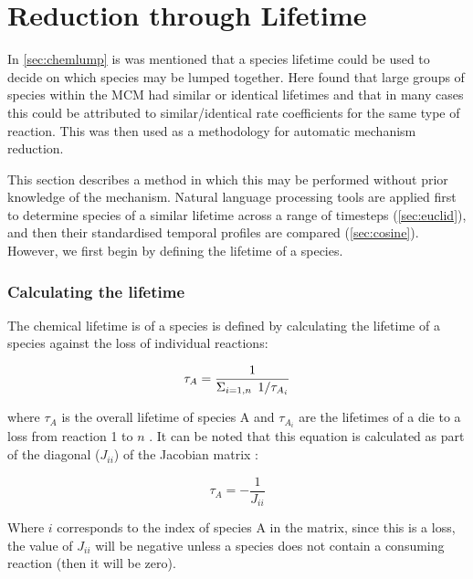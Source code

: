   \section{Reduction through Lifetime}\label{sec:lifetime}
  In \autoref{sec:chemlump} is was mentioned that a species lifetime could be used to decide on which species may be lumped together. Here \cite{lifetime} found that large groups of species within the MCM had similar or identical lifetimes and that in many cases this could be attributed to similar/identical rate coefficients for the same type of reaction. This was then used as a methodology for automatic mechanism reduction.

  This section describes a method in which this may be performed without prior knowledge of the mechanism. Natural language processing tools are applied first to determine species of a similar lifetime across a range of timesteps (\autoref{sec:euclid}), and then their standardised temporal profiles are compared (\autoref{sec:cosine}). However, we first begin by defining the lifetime of a species.

  \subsubsection{Calculating the lifetime}
  The chemical lifetime is of a species is defined by calculating the lifetime of a species against the loss of individual reactions:





    \begin{equation}
    \tau_A = \frac{1}{\Large{\Sigma}_{i=1,n}\  {1}/{\tau_{A_i}}}
    \end{equation}

where $\tau_A$ is the overall lifetime of species A and $\tau_{A_i}$ are the lifetimes of a die to a loss from reaction 1 to $n$ \citep{fundamentals}. It can be noted that this equation is calculated as part of the diagonal ($J_{ii}$) of the Jacobian matrix \citep{kinetics,lifetime}:


  \begin{equation}
  \tau_A = - \frac{1}{J_{ii}}
  \end{equation}

Where $i$ corresponds to the index of species A in the matrix, since this is a loss, the value of $J_{ii}$ will be negative unless a species does not contain a consuming reaction (then it will be zero).

